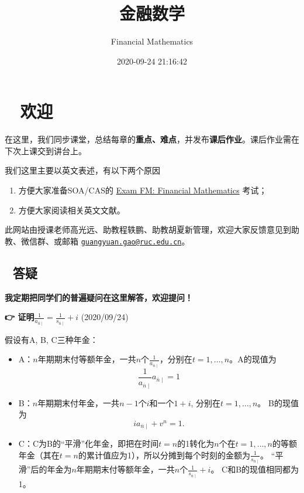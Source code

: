 \documentclass[
]{book}
\title{金融数学}
\author{Financial Mathematics}
\date{2020-09-24 21:16:42}
\begin{document}
\maketitle

{
\setcounter{tocdepth}{1}
\tableofcontents
}
\hypertarget{ux6b22ux8fce}{%
\chapter*{👨‍🏫 欢迎}\label{ux6b22ux8fce}}

在这里，我们同步课堂，总结每章的\textbf{重点、难点}，并发布\textbf{课后作业}。课后作业需在下次上课交到讲台上。

我们这里主要以英文表述，有以下两个原因

\begin{enumerate}
\def\labelenumi{\arabic{enumi}.}
\item
  方便大家准备SOA/CAS的 \href{https://www.soa.org/education/exam-req/edu-exam-fm-detail/}{Exam FM: Financial Mathematics} 考试；
\item
  方便大家阅读相关英文文献。
\end{enumerate}

此网站由授课老师高光远、助教程轶鹏、助教胡夏新管理，欢迎大家反馈意见到助教、微信群、或邮箱 \href{mailto:guangyuan.gao@ruc.edu.cn}{\nolinkurl{guangyuan.gao@ruc.edu.cn}}。

\hypertarget{ux7b54ux7591}{%
\section*{🤔 答疑}\label{ux7b54ux7591}}

\textbf{我定期把同学们的普遍疑问在这里解答，欢迎提问！}

\textbf{👉 证明\(\frac{1}{a_{\overline{n}\mid}}=\frac{1}{s_{\overline{n}\mid}}+i\)} (2020/09/24)

假设有A, B, C三种年金：

\begin{itemize}
\item
  A：\(n\)年期期末付等额年金，一共\(n\)个\(\frac{1}{a_{\overline{n}\mid}}\)，分别在\(t=1,\ldots,n\)。A的现值为\[\frac{1}{a_{\overline{n}\mid}} a_{\overline{n}\mid}=1\]
\item
  B：\(n\)年期期末付年金，一共\(n-1\)个\(i\)和一个\(1+i\), 分别在\(t=1,\ldots,n\)。 B的现值为\[ia_{\overline{n}\mid}+v^n=1.\]
\item
  C：C为B的``平滑''化年金，即把在时间\(t=n\)的1转化为\(n\)个在\(t=1,\ldots,n\)的等额年金（其在\(t=n\)的累计值应为1），所以分摊到每个时刻的金额为\(\frac{1}{s_{\overline{n}\mid}}\)。 ``平滑''后的年金为\(n\)年期期末付等额年金，一共\(n\)个\(\frac{1}{s_{\overline{n}\mid}}+i\)。 C和B的现值相同都为1。
\end{itemize}
\end{document}

